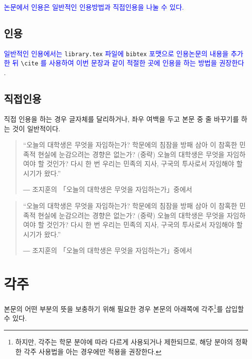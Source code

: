 \textcolor{blue}{ 논문에서 인용은 일반적인 인용방법과 직접인용을 나눌 수 있다. }

\subsection{인용}

\textcolor{blue}{ 일반적인 인용에서는 }
\verb|library.tex| 
\textcolor{blue}{ 파일에 }
\verb|bibtex| 
\textcolor{blue}{ 포맷으로 인용논문의 내용을 추가한 뒤 }
\verb|\cite|
\textcolor{blue}{ 를 사용하여 이번 문장과 같이 적절한 곳에 인용을 하는 방법을 권장한다} \cite{LSTM, pure}.

\subsection{직접인용}
직접 인용을 하는 경우 글자체를 달리하거나, 좌우 여백을 두고 본문 중 줄 바꾸기를 하는 것이 일반적이다.\par
\bigskip

\begin{quote}
“오늘의 대학생은 무엇을 자임하는가? 학문에의 침잠을 방패 삼아 이 참혹한 민족적 현실에 눈감으려는 경향은 없는가? (중략) 오늘의 대학생은 무엇을 자임하여야 할 것인가? 다시 한 번 우리는 민족의 지사, 구국의 투사로서 자임해야 할 시기가 왔다.” \par
― 조지훈의  「오늘의 대학생은 무엇을 자임하는가」중에서 
\end{quote}
\bigskip

\begin{quotation}
“오늘의 대학생은 무엇을 자임하는가? 학문에의 침잠을 방패 삼아 이 참혹한 민족적 현실에 눈감으려는 경향은 없는가? (중략) 오늘의 대학생은 무엇을 자임하여야 할 것인가? 다시 한 번 우리는 민족의 지사, 구국의 투사로서 자임해야 할 시기가 왔다.” \par
― 조지훈의  「오늘의 대학생은 무엇을 자임하는가」중에서 
\end{quotation}

\newpage

\section{각주}\label{sec:footnotes}

본문의 어떤 부분의 뜻을 보충하기 위해 필요한 경우 본문의 아래쪽에 각주\footnote{하지만, 각주는 학문 분야에 따라 다르게 사용되거나 제한되므로, 해당 분야의 정확한 각주 사용법을 아는 경우에만 적용을 권장한다.}를 삽입할 수 있다.


